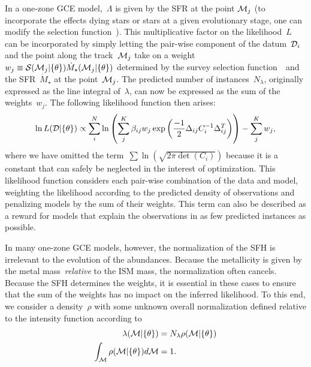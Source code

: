 \documentclass[ms.tex]{subfiles}
\begin{document}
In a one-zone GCE model,~$\Lambda$ is given by the SFR at the point
$\mathcal{M}_j$ (to incorporate the effects dying stars or stars at a given
evolutionary stage, one can modify the selection function~).
This multiplicative factor on the likelihood~$L$ can be incorporated by simply
letting the pair-wise component of the datum~$\mathcal{D}_i$ and the point along
the track~$\mathcal{M}_j$ take on a weight
$w_j \equiv \mathcal{S}(\mathcal{M}_j | \{\theta\}) \dot{M}_\star(\mathcal{M}_j |
\{\theta\})$ determined by the survey selection function~~and the
SFR~$\dot{M}_\star$ at the point~$\mathcal{M}_j$.
The predicted number of instances~$N_\lambda$, originally expressed as the
line integral of~$\lambda$, can now be expressed as the sum of the
weights~$w_j$.
The following likelihood function then arises:
\begin{equation}
\ln L(\mathcal{D} | \{\theta\}) \propto
\sum_i^N \ln \left(\sum_j^K
\beta_{ij} w_j \exp\left(\frac{-1}{2}\Delta_{ij} C_i^{-1} \Delta_{ij}^T\right)
\right) - \sum_j^K w_j,
\label{eq:lnL_minus_weights}
\end{equation}
where we have omitted the term~$\sum \ln \left(\sqrt{2\pi \det{(C_i)}}\right)$
because it is a constant that can safely be neglected in the interest of
optimization.
This likelihood function considers each pair-wise combination of the data and
model, weighting the likelihood according to the predicted density of
observations and penalizing models by the sum of their weights.
This term can also be described as a reward for models that explain the
observations in as few predicted instances as possible.
\par
In many one-zone GCE models, however, the normalization of the SFH is
irrelevant to the evolution of the abundances.
Because the metallicity is given by the metal mass~\textit{relative} to the ISM
mass, the normalization often cancels.
Because the SFH determines the weights, it is essential in these cases to
ensure that the sum of the weights has no impact on the inferred likelihood.
To this end, we consider a density~$\rho$ with some unknown overall
normalization defined relative to the intensity function according to
\begin{subequations}\begin{align}
\lambda(\mathcal{M} | \{\theta\}) &= N_\lambda \rho(\mathcal{M} | \{\theta\})
\\
\int_{\mathcal{M}} \rho(\mathcal{M} | \{\theta\}) d\mathcal{M} &= 1.
\end{align}\end{subequations}
\end{document}
